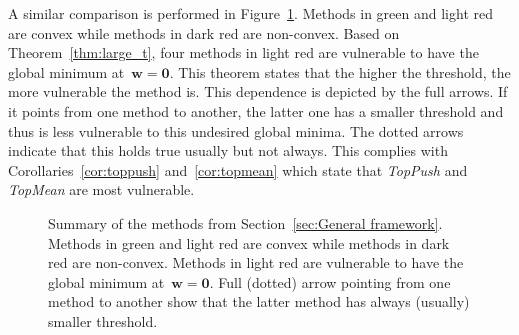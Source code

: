 \documentclass[11pt,a4paper]{article}
\theoremstyle{definition}
\newcommand{\toppush}{\textit{TopPush}\xspace}
\newcommand{\toppushk}{\textit{TopPush$K$}\xspace}
\newcommand{\grill}{\textit{Grill}\xspace}
\newcommand{\patmat}{\textit{Pat}\textup{\&}\textit{Mat}\xspace}
\newcommand{\topmean}{\textit{TopMean}\xspace}
\newcommand{\grillnp}{\textit{Grill-NP}\xspace}
\newcommand{\patmatnp}{\textit{Pat}\textup{\&}\textit{Mat-NP}\xspace}
\newcommand{\topmeannp}{\textit{TopMean-NP}\xspace}
\begin{document}
A similar comparison is performed in Figure~\ref{fig:thresholds}. Methods in green and light red are convex while methods in dark red are non-convex. Based on Theorem~\ref{thm:large_t}, four methods in light red are vulnerable to have the global minimum at~$\bm{w} = \bm{0}.$ This theorem states that the higher the threshold, the more vulnerable the method is. This dependence is depicted by the full arrows. If it points from one method to another, the latter one has a smaller threshold and thus is less vulnerable to this undesired global minima. The dotted arrows indicate that this holds true usually but not always. This complies with Corollaries~\ref{cor:toppush} and~\ref{cor:topmean} which state that \toppush and \topmean are most vulnerable.

\begin{figure}[!ht]
  \centering
  \caption{Summary of the methods from Section~\ref{sec:General framework}. Methods in green and light red are convex while methods in dark red are non-convex. Methods in light red are vulnerable to have the global minimum at~$\bm{w} = \bm{0}.$ Full (dotted) arrow pointing from one method to another show that the latter method has always (usually) smaller threshold.}
  \label{fig:thresholds}
\end{figure}


\end{document}
